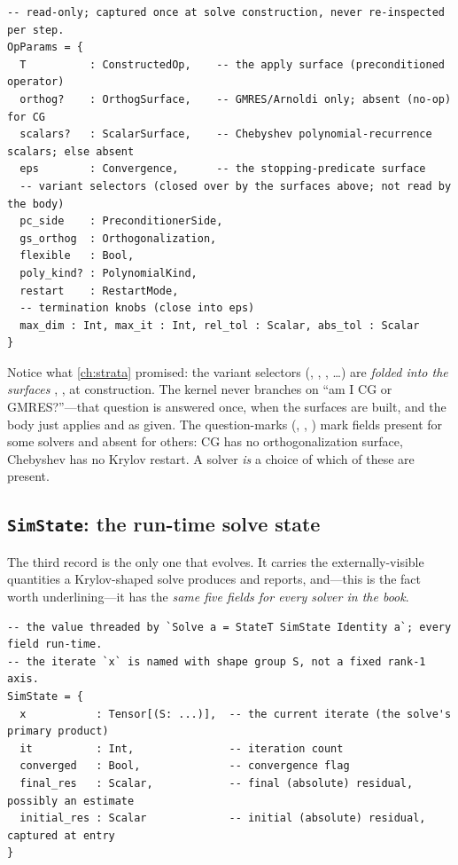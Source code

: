 \begin{lstlisting}[style=l4style]
-- read-only; captured once at solve construction, never re-inspected per step.
OpParams = {
  T          : ConstructedOp,    -- the apply surface (preconditioned operator)
  orthog?    : OrthogSurface,    -- GMRES/Arnoldi only; absent (no-op) for CG
  scalars?   : ScalarSurface,    -- Chebyshev polynomial-recurrence scalars; else absent
  eps        : Convergence,      -- the stopping-predicate surface
  -- variant selectors (closed over by the surfaces above; not read by the body)
  pc_side    : PreconditionerSide,
  gs_orthog  : Orthogonalization,
  flexible   : Bool,
  poly_kind? : PolynomialKind,
  restart    : RestartMode,
  -- termination knobs (close into eps)
  max_dim : Int, max_it : Int, rel_tol : Scalar, abs_tol : Scalar
}
\end{lstlisting}
Notice what \cref{ch:strata} promised: the variant selectors (,
, , \dots) are \emph{folded into the surfaces}
, ,  at construction. The kernel never branches on
``am I CG or GMRES?''---that question is answered once, when the surfaces are
built, and the body just applies  and  as given. The
question-marks (, , ) mark fields
present for some solvers and absent for others: CG has no orthogonalization
surface, Chebyshev has no Krylov restart. A solver \emph{is} a choice of which of
these are present.

\subsection{\texttt{SimState}: the run-time solve state}

The third record is the only one that evolves. It carries the externally-visible
quantities a Krylov-shaped solve produces and reports, and---this is the fact worth
underlining---it has the \emph{same five fields for every solver in the book}.

\begin{lstlisting}[style=l4style]
-- the value threaded by `Solve a = StateT SimState Identity a`; every field run-time.
-- the iterate `x` is named with shape group S, not a fixed rank-1 axis.
SimState = {
  x           : Tensor[(S: ...)],  -- the current iterate (the solve's primary product)
  it          : Int,               -- iteration count
  converged   : Bool,              -- convergence flag
  final_res   : Scalar,            -- final (absolute) residual, possibly an estimate
  initial_res : Scalar             -- initial (absolute) residual, captured at entry
}
\end{lstlisting}

